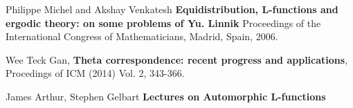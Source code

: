 \documentclass[12pt]{article}
\begin{document}
\vfill


\selectfont \fontsize{12}{10}\selectfont

\begin{thebibliography}{}

\item Philippe Michel and Akshay Venkatesh \textbf{Equidistribution, L-functions and ergodic theory: on some problems of Yu. Linnik} Proceedings of the International Congress
of Mathematicians, Madrid, Spain, 2006.

\item  Wee Teck Gan, \textbf{Theta correspondence: recent progress and applications}, Procedings of
ICM (2014) Vol. 2, 343-366.

\item James Arthur, Stephen Gelbart \textbf{Lectures on Automorphic L-functions}

\end{thebibliography}

\newpage  

\selectfont \fontsize{12.5}{15}\selectfont
\end{document}
